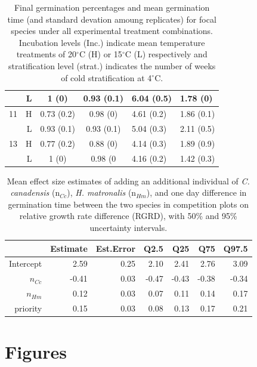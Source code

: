 \documentclass{article}[11pt]
\begin{document}
\begin{table}[hp]
\begin{tabular}{|rr|cc|ll|}
 & L & 1 (0) & 0.93 (0.1) & 6.04 (0.5) & 1.78 (0) \\ 
      \hline
   11 & H & 0.73 (0.2) & 0.98 (0) & 4.61 (0.2) & 1.86 (0.1) \\ 
 & L & 0.93 (0.1) & 0.93 (0.1) & 5.04 (0.3) & 2.11 (0.5) \\ 
      \hline
   13 & H & 0.77 (0.2) & 0.88 (0) & 4.14 (0.3) & 1.89 (0.9) \\ 
 & L & 1 (0) & 0.98 (0 & 4.16 (0.2) & 1.42 (0.3) \\ 
   \hline
\end{tabular}
\caption{Final germination percentages and mean germination time (and standard devation amoung replicates) for focal species under all experimental treatment combinations. Incubation levels (Inc.) indicate mean temperature treatments of 20$^\circ$C (H) or 15$^\circ$C (L) respectively and stratification level (strat.) indicates the number of weeks of cold stratification at 4$^\circ$C.} %
\label{tab:germcomps}
\end{table}

\pagebreak[4]

\begin{table}[hp]
\centering
\begin{tabular}{rrrrrrr}
  \hline
 & Estimate & Est.Error & Q2.5 & Q25 & Q75 & Q97.5 \\ 
  \hline
Intercept & 2.59 & 0.25 & 2.10 & 2.41 & 2.76 & 3.09 \\ 
  $n_{Cc}$ & -0.41 & 0.03 & -0.47 & -0.43 & -0.38 & -0.34 \\ 
  $n_{Hm}$ & 0.12 & 0.03 & 0.07 & 0.11 & 0.14 & 0.17 \\ 
  priority & 0.15 & 0.03 & 0.08 & 0.13 & 0.17 & 0.21 \\ 
   \hline
\end{tabular}
\caption{Mean effect size estimates of adding an additional individual of \textit{C. canadensis} (n$_{Cc}$), \textit{H. matronalis} (n$_{Hm}$), and one day difference in germination time between the two species in competition plots on relative growth rate difference (RGRD), with 50\% and 95\% uncertainty intervals.}
\label{tab:RGRD}
\end{table}

\pagebreak[4]

\section*{Figures}
\end{document}

